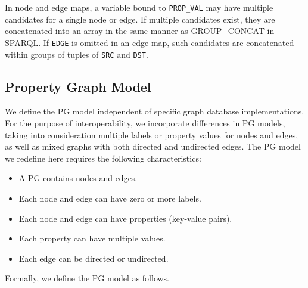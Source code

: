 \documentclass[runningheads]{llncs}
\begin{document}
In node and edge maps, a variable bound to \texttt{PROP\_VAL} may have multiple candidates for a single node or edge. If multiple candidates exist, they are concatenated into an array in the same manner as GROUP\_CONCAT in SPARQL. If \texttt{EDGE} is omitted in an edge map, such candidates are concatenated within groups of tuples of \texttt{SRC} and \texttt{DST}.



\subsection{Property Graph Model}
We define the PG model independent of specific graph database implementations. For the purpose of interoperability, we incorporate differences in PG models, taking into consideration multiple labels or property values for nodes and edges, as well as mixed graphs with both directed and undirected edges. The PG model we redefine here requires the following characteristics:

\begin{itemize}
    \item A PG contains nodes and edges.
    \item Each node and edge can have zero or more labels.
    \item Each node and edge can have properties (key-value pairs).
    \item Each property can have multiple values.
    \item Each edge can be directed or undirected.
\end{itemize}
Formally, we define the PG model as follows.
\end{document}
